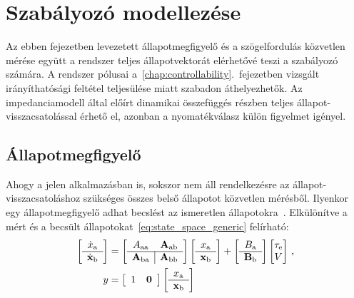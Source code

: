 \chapter{Szabályozó modellezése}\label{chap:controller}

Az ebben fejezetben levezetett állapotmegfigyelő és a szögelfordulás közvetlen mérése
együtt a rendszer teljes állapotvektorát elérhetővé teszi a szabályozó számára. A rendszer pólusai a~\ref{chap:controllability}.\ fejezetben
vizsgált irányíthatósági feltétel teljesülése miatt szabadon áthelyezhetők. 
Az impedanciamodell által előírt dinamikai összefüggés részben teljes állapot-visszacsatolással érhető el, 
azonban a nyomatékválasz külön figyelmet igényel.  

\section{Állapotmegfigyelő}\label{chap:observer}
Ahogy a jelen alkalmazásban is, sokszor nem áll rendelkezésre az állapot-visszacsatoláshoz szükséges 
összes belső állapotot közvetlen mérésből. Ilyenkor egy állapotmegfigyelő adhat becslést az ismeretlen 
állapotokra~\citep{kalman1960new,OgataModernControl}. Elkülönítve a mért és a becsült állapotokat~\eqref{eq:state_space_generic} 
felírható:
\begin{equation}\label{eq:observer_state}
    \begin{split}
    \left[\begin{array}{c}
        \dot x_{\mathrm{a}} \\ \hline
        \dot{\mathbf{x}}_{\mathrm{b}}
    \end{array}\right]
    &=
    \left[\begin{array}{c|c}
        A_{\mathrm{aa}} & \mathbf{A}_{\mathrm{a b}} \\ \hline
        \mathbf{A}_{\mathrm{ba}} & \mathbf{A}_{\mathrm{bb}}
    \end{array}\right]
    \left[\begin{array}{c}
        x_{\mathrm{a}} \\ \hline
        \mathbf{x}_{\mathrm{b}}
    \end{array}\right]
    +
    \left[\begin{array}{c}
        B_{\mathrm{a}} \\ \hline
        \mathbf{B}_{\mathrm{b}}
    \end{array}\right]
    \begin{bmatrix}
        \tau_{\mathrm{e}} \\
        V \\
    \end{bmatrix}\,,\\
    y &= 
    \left[\begin{array}{c|c}
        1 & \mathbf{0}
    \end{array}\right]
    \left[\begin{array}{c}
        x_{\mathrm{a}} \\ \hline
        \mathbf{x}_{\mathrm{b}}
    \end{array}\right]
    \end{split}
\end{equation}
